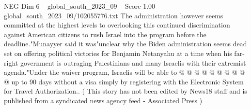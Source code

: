 \begin{textsample}{NEG Dim 6 – global\_south\_2023\_09 – Score 1.00 – global\_south\_2023\_09/102055776.txt}
The administration however seems committed at the highest levels to overlooking this continued discrimination against American citizens to rush Israel into the program before the deadline."Munayyer said it was"unclear why the Biden administration seems dead set on offering political victories for Benjamin Netanyahu at a time when his far-right government is outraging Palestinians and many Israelis with their extremist agenda."Under the waiver program, Israelis will be able to @ @ @ @ @ @ @ @ @ @ up to 90 days without a visa simply by registering with the Electronic System for Travel Authorization.. ( This story has not been edited by News18 staff and is published from a syndicated news agency feed - Associated Press )

\end{textsample}

